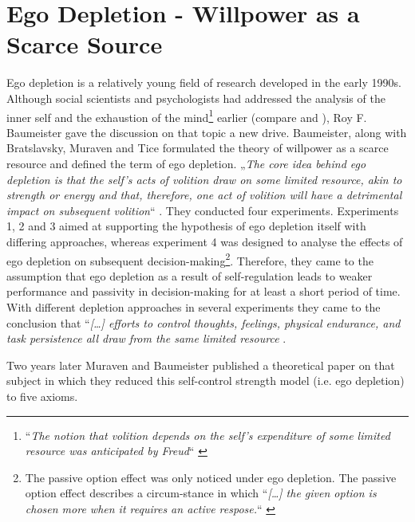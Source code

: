 \section{Ego Depletion - Willpower as a Scarce Source}
Ego depletion is a relatively young field of research developed in the early 1990s. Although social scientists and psychologists had addressed the analysis of the inner self and the exhaustion of the mind\footnote{“\emph{The notion that volition depends on the self’s expenditure of some limited resource was anticipated by Freud}“ \citep{baumeister1998ego}} earlier (compare \citep{ross1975perceived} and \citep{brody1968personality}), Roy F. Baumeister \citep{baumeister1998ego} gave the discussion on that topic a new drive. Baumeister, along with Bratslavsky, Muraven and Tice formulated the theory of willpower as a scarce resource and defined the term of ego depletion. „\emph{The core idea behind ego depletion is that the self's acts of volition draw on some limited resource, akin to strength or energy and that, therefore, one act of volition will have a detrimental impact on subsequent volition}“ \citep{baumeister1998ego}. They conducted four experiments. Experiments 1, 2 and 3 aimed at supporting the hypothesis of ego depletion itself with differing approaches, whereas experiment 4 was designed to analyse the effects of ego depletion on subsequent decision-making\footnote{The passive option effect was only noticed under ego depletion. The passive option effect describes a circum-stance in which “\emph{[\ldots] the given option is chosen more when it requires an active respose.}“ \citep{baumeister1998ego}}. Therefore, they came to the assumption that ego depletion as a result of self-regulation leads to weaker performance and passivity in decision-making for at least a short period of time. With different depletion approaches in several experiments they came to the conclusion that “\emph{[\ldots] efforts to control thoughts, feelings, physical endurance, and task persistence all draw from the same limited resource} \citep{muraven1998self}.\par
Two years later Muraven and Baumeister \citep{muraven2000self} published a theoretical paper on that subject in which they reduced this self-control strength model (i.e. ego depletion) to five axioms.
